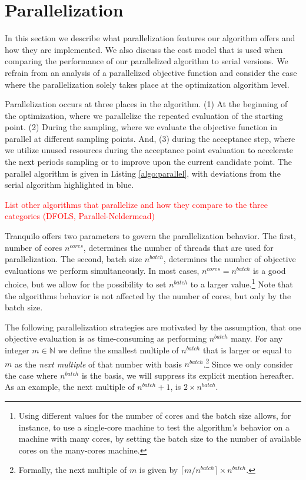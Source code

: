 \section{Parallelization}\label{sec:parallelization}

In this section we describe what parallelization features our algorithm offers and how they are
implemented. We also discuss the cost model that is used when comparing the performance of our
parallelized algorithm to serial versions. We refrain from an analysis of a parallelized objective
function and consider the case where the parallelization solely takes place at the optimization
algorithm level.

Parallelization occurs at three places in the algorithm. (1) At the beginning of the optimization,
where we parallelize the repeated evaluation of the starting point. (2) During the sampling, where
we evaluate the objective function in parallel at different sampling points. And, (3) during the
acceptance step, where we utilize unused resources during the acceptance point evaluation to
accelerate the next periods sampling or to improve upon the current candidate point. The parallel
algorithm is given in Listing \ref{algo:parallel}, with deviations from the serial algorithm
highlighted in blue.

\textcolor{red}{List other algorithms that parallelize and how they compare to the three categories
(DFOLS, Parallel-Neldermead)}

Tranquilo offers two parameters to
govern the parallelization behavior. The first, number of cores $n^{cores}$, determines the number
of threads that are used for parallelization. The second, batch size $n^{batch}$, determines the
number of objective evaluations we perform simultaneously. In most cases, $n^{cores} = n^{batch}$ is
a good choice, but we allow for the possibility to set $n^{batch}$ to a larger value.\footnote{Using
different values for the number of cores and the batch size allows, for instance, to use a
single-core machine to test the algorithm's behavior on a machine with many cores, by setting the
batch size to the number of available cores on the many-cores machine.} Note that the algorithms
behavior is not affected by the number of cores, but only by the batch size.

The following parallelization strategies are motivated by the assumption, that one
objective evaluation is as time-consuming as performing $n^{batch}$ many. For any integer $m \in
\mathbb{N}$ we define the smallest multiple of $n^{batch}$ that is larger or equal to $m$ as the
\emph{next multiple} of that number with basis $n^{batch}$.\footnote{Formally, the next
multiple of $m$ is given by $\lceil m / n^{batch}\rceil \times n^{batch}$.} Since we only consider
the case where $n^{batch}$ is the basis, we will suppress its explicit mention hereafter. As an
example, the next multiple of $n^{batch} + 1$, is $2 \times n^{batch}$.

